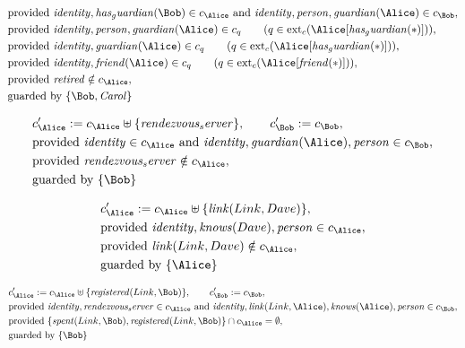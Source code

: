 \begin{align*}
&
\text{provided } 
\mathit{
identity
}
,
\mathit{
has_guardian
}
(
\Bob
)
 \in c_
{
\Alice
}
 \text{ and } 
\mathit{
identity
}
,
\mathit{
person
}
,
\mathit{
guardian
}
(
\Alice
)
 \in c_
{
\Bob
}
,\\
&
\text{provided } 
\mathit{
identity
}
,
\mathit{
person
}
,
\mathit{
guardian
}
(
\Alice
)
 \in c_
q
 \qquad (
q \in 
\mathrm{ext}_c(
\Alice
[
\mathit{
has_guardian
}
(
\ast
)
]
)
)
,\\
&
\text{provided } 
\mathit{
identity
}
,
\mathit{
guardian
}
(
\Alice
)
 \in c_
q
 \qquad (
q \in 
\mathrm{ext}_c(
\Alice
[
\mathit{
has_guardian
}
(
\ast
)
]
)
)
,\\
&
\text{provided } 
\mathit{
identity
}
,
\mathit{
friend
}
(
\Alice
)
 \in c_
q
 \qquad (
q \in 
\mathrm{ext}_c(
\Alice
[
\mathit{
friend
}
(
\ast
)
]
)
)
,\\
&
\text{provided } 
\mathit{
retired
}
 \notin c_
{
\Alice
}
,\\
&
\text{guarded by } \{
\Bob
,
\mathit{Carol}
\}
\end{align*}

\begin{align*}
&
c'_
{
\Alice
}
 := 
c_
{
\Alice
}
 \uplus 
\{
\mathit{
rendezvous_server
}
\}
, \qquad 
c'_
{
\Bob
}
 := 
c_
{
\Bob
}
,\\
&
\text{provided } 
\mathit{
identity
}
 \in c_
{
\Alice
}
 \text{ and } 
\mathit{
identity
}
,
\mathit{
guardian
}
(
\Alice
)
,
\mathit{
person
}
 \in c_
{
\Bob
}
,\\
&
\text{provided } 
\mathit{
rendezvous_server
}
 \notin c_
{
\Alice
}
,\\
&
\text{guarded by } \{
\Bob
\}
\end{align*}

\begin{align*}
&
c'_
{
\Alice
}
 := 
c_
{
\Alice
}
 \uplus 
\{
\mathit{
link
}
(
Link
,
Dave
)
\}
,\\
&
\text{provided } 
\mathit{
identity
}
,
\mathit{
knows
}
(
Dave
)
,
\mathit{
person
}
 \in c_
{
\Alice
}
,\\
&
\text{provided } 
\mathit{
link
}
(
Link
,
Dave
)
 \notin c_
{
\Alice
}
,\\
&
\text{guarded by } \{
\Alice
\}
\end{align*}

\begin{align*}
&
c'_
{
\Alice
}
 := 
c_
{
\Alice
}
 \uplus 
\{
\mathit{
registered
}
(
Link
,
\Bob
)
\}
, \qquad 
c'_
{
\Bob
}
 := 
c_
{
\Bob
}
,\\
&
\text{provided } 
\mathit{
identity
}
,
\mathit{
rendezvous_server
}
 \in c_
{
\Alice
}
 \text{ and } 
\mathit{
identity
}
,
\mathit{
link
}
(
Link
,
\Alice
)
,
\mathit{
knows
}
(
\Alice
)
,
\mathit{
person
}
 \in c_
{
\Bob
}
,\\
&
\text{provided } 
\{
\mathit{
spent
}
(
Link
,
\Bob
)
,
\mathit{
registered
}
(
Link
,
\Bob
)
\}
 \cap c_
{
\Alice
}
 = \emptyset
,\\
&
\text{guarded by } \{
\Bob
\}
\end{align*}
